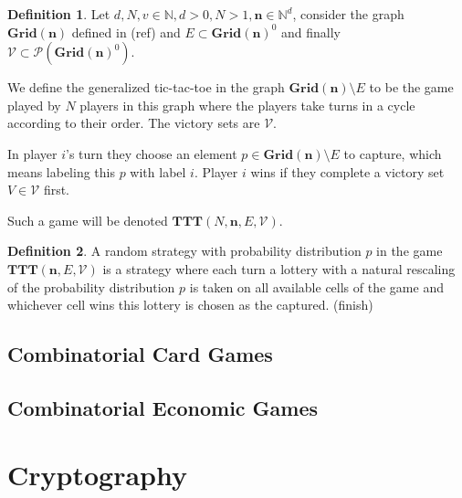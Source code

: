\documentclass[]{article}
\theoremstyle{definition}
\newtheorem{definition}{Definition}[section]
\theoremstyle{definition}
\newcommand{\ttt}{\textbf{TTT}}
\newcommand{\grid}{\textbf{Grid}}
\newcommand{\bb}{\mathbb}
\begin{document}
	\begin{definition}
		
		Let $d, N, v \in \bb{N}, d > 0, N > 1, \textbf{n} \in \bb{N}^d$, consider the graph $\grid(\textbf{n})$ defined in (ref) and $E \subset \grid(\textbf{n})^0$ and finally $\mathcal{V} \subset \mathcal{P}(\grid(\textbf{n})^0)$. 
		
		We define the generalized tic-tac-toe in the graph $\grid(\textbf{n}) \setminus E$ to be the game played by $N$ players in this graph where the players take turns in a cycle according to their order. The victory sets are $\mathcal{V}$.
		
		
		
		In player $i$'s turn they choose an element $p \in \grid(\textbf{n}) \setminus E$ to capture, which means labeling this $p$ with label $i$. Player $i$ wins if they complete a victory set $V \in \mathcal{V}$ first. 
		
		Such a game will be denoted $\ttt(N, \textbf{n}, E, \mathcal{V})$.
		
	\end{definition}
	
	
	
	\begin{definition}
		
		A random strategy with probability distribution $p$ in the game $\ttt(\textbf{n}, E, \mathcal{V})$ is a strategy where each turn a lottery with a natural rescaling of the probability distribution $p$ is taken on all available cells of the game and whichever cell wins this lottery is chosen as the captured. (finish)
		
	\end{definition}
	
	
	
	
	\subsection{Combinatorial Card Games}
	\subsection{Combinatorial Economic Games}
	
	\section{Cryptography}
\end{document}
